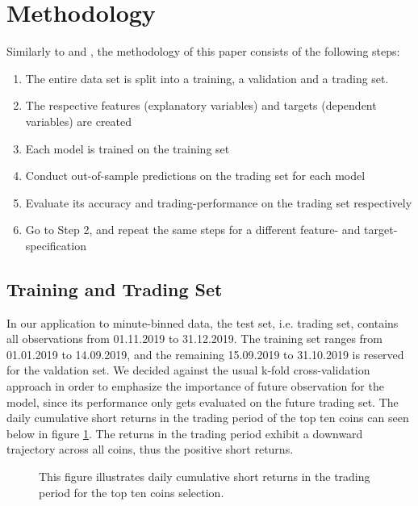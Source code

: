 \section{Methodology}
Similarly to 
\cite{krauss2016arbitrageSandP} 
and \cite{krauss2019statisticalArbitrage},
the methodology of this paper consists of
the following steps:

\begin{enumerate}
    \item The entire data set is split into a training, a validation and a trading set.
    \item The respective features (explanatory variables) and targets (dependent variables) are created
    \item Each model is trained on the training set
    \item Conduct out-of-sample predictions on the trading set for each model 
    \item Evaluate its accuracy and trading-performance on the trading set respectively
    \item Go to Step 2, and repeat the same steps for a different feature- and target-specification
\end{enumerate}



\subsection{Training and Trading Set} \label{ch:training_trading}
In our application to minute-binned data, the test set, i.e. trading set, contains all observations from 01.11.2019 to 31.12.2019.
The training set ranges from 01.01.2019 to 14.09.2019, and the remaining 15.09.2019 to 31.10.2019 
is reserved for the valdation set. We decided against the usual k-fold cross-validation approach 
in order to emphasize the importance of future observation for the model, since its performance only gets
evaluated on the future trading set. The daily cumulative short returns in the trading period of the top ten coins can
seen below in figure \ref{fig:all_top_10_daily_cum_returns}. The returns in the trading period 
exhibit a downward trajectory across all coins, thus the positive short returns.

\begin{figure}[H] 
    \captionsetup{format=plain}
    \caption{
        This figure illustrates daily cumulative short returns in the trading period for the top ten coins selection.
    }
    \label{fig:all_top_10_daily_cum_returns}
\end{figure}


